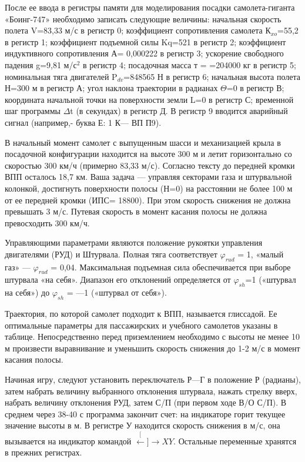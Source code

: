 \documentclass[11pt,a4paper,oneside]{article}
\def\XY{$\stackrel[\leftarrow]{\rightarrow}{XY}$}
\begin{document}
После ее ввода в регистры памяти для моделирования посадки самолета-гиганта «Боинг-747» необходимо записать следующие величины: начальная скорость полета V=83,33 м/с в регистр 0; коэффициент сопротивления самолета К$_{xo}$=55,2 в регистр 1; коэффициент подъемной силы Kq=521 в регистр 2; коэффициент индуктивного сопротивления А= 0,000222 в регистр 3; ускорение свободного падения g=9,81 м/с$^{2}$ в регистр 4; посадочная масса т = =204000 кг в регистр 5; номинальная тяга двигателей P$_{dv}$=848565 Н в регистр 6; начальная высота полета Н=300 м в регистр А; угол наклона траектории в радианах $\Theta$=0 в регистр В; координата начальной точки на поверхности земли L=0 в регистр С; временной шаг программы $\Delta$t (в секундах) в регистр Д. В регистр 9 вводится аварийный сигнал (например,- буква Е: 1 К— ВП П9).

В начальный момент самолет с выпущенным шасси и механизацией крыла в посадочной конфигурации находится на высоте 300 м и летит горизонтально со скоростью 300 км/ч (примерно 83,33 м/с). Согласно тексту до передней кромки ВПП осталось 18,7 км. Ваша задача — управляя секторами газа и штурвальной колонкой, достигнуть поверхности полосы (Н=0) на расстоянии не более 100 м от ее передней кромки (ИПС= 18800). При этом скорость снижения не должна превышать 3 м/с. Путевая скорость в момент касания полосы не должна превосходить 300 км/ч.

Управляющими параметрами являются положение рукоятки управления двигателями (РУД) и Штурвала. Полная тяга соответствует $\varphi_{rud}$ = 1, «малый газ» — $\varphi_{rud}$ = 0,04. Максимальная подъемная сила обеспечивается при выборе штурвала «на себя». Диапазон его отклонений определяется от $\varphi_{sh}$=1 («штурвал на себя») до $\varphi_{sh}$ = —1 («штурвал от себя»).

Траектория, по которой самолет подходит к ВПП, называется глиссадой. Ее оптимальные параметры для пассажирских и учебного самолетов указаны в таблице. Непосредственно перед приземлением необходимо с высоты не менее 10 м произвести выравнивание 
и уменьшить скорость снижения до 1-2 м/с в момент касания полосы.

Начиная игру, следуют установить переключатель Р—Г в положение Р (радианы), затем набрать величину выбранного отклонения штурвала, нажать стрелку вверх, набрать величину отклонения РУД, затем С/П (при первом ходе В/О С/П). В среднем через 38-40 с программа закончит счет: на индикаторе горит текущее значение высоты в м. В регистре У находится скорость снижения в м/с, она вызывается на индикатор командой \XY. Остальные переменные хранятся в прежних регистрах.
\end{document}
